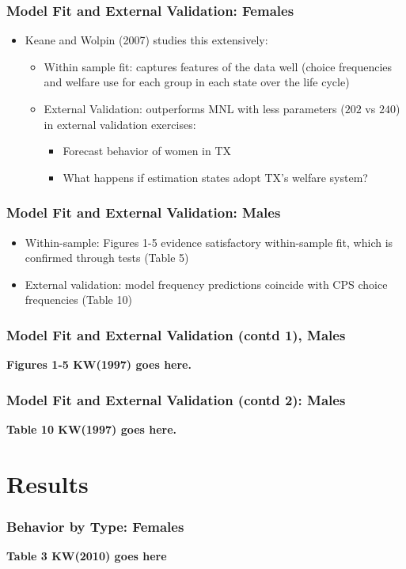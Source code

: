 \begin{frame}
	\frametitle{Model Fit and External Validation: Females}
		\begin{itemize}
			\item Keane and Wolpin (2007) studies this  extensively:
				\begin{itemize}
					\item Within sample fit: captures features of the data well (choice frequencies and welfare use for each group in each state over the life cycle)
					\item External Validation: outperforms MNL with less parameters ($202$ vs $240$) in external validation exercises: 
					\begin{itemize}
						\item Forecast behavior of women in TX
						\item What happens if estimation states adopt TX's welfare system?
					\end{itemize}
				\end{itemize}
		\end{itemize}				
\end{frame}

\begin{frame}
	\frametitle{Model Fit and External Validation: Males}
		\begin{itemize}
			\item Within-sample: Figures 1-5 evidence satisfactory within-sample fit, which is confirmed through tests (Table 5)
			\item External validation: model frequency predictions coincide with CPS choice frequencies (Table 10)
		\end{itemize}
\end{frame}

\begin{frame}
	\frametitle{Model Fit and External Validation (contd 1), Males}
	\textbf{Figures 1-5 KW(1997) goes here.}
\end{frame}

\begin{frame}
	\frametitle{Model Fit and External Validation (contd 2): Males}
	\textbf{Table 10 KW(1997) goes here.}
\end{frame}

\section{Results}
\begin{frame}
	\frametitle{Behavior by Type: Females}
	\textbf{Table 3 KW(2010) goes here}	
\end{frame}

